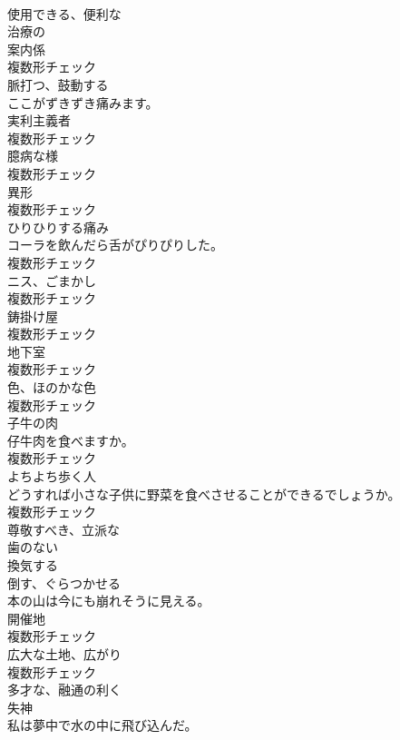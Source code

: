 \documentclass[8pt]{extreport}
\begin{document}
\begin{CJK}{UTF8}{min}
\\	[形容詞]	使用できる、便利な	
\\	[形容詞]	治療の	
\\	[名詞]	案内係	
\\	複数形チェック
\\	[動詞]	脈打つ、鼓動する	
\\	ここがずきずき痛みます。	
\\	[名詞]	実利主義者	
\\	複数形チェック
\\	[名詞]	臆病な様	
\\	複数形チェック
\\	[名詞]	異形	
\\	複数形チェック
\\	[名詞]	ひりひりする痛み	
\\	コーラを飲んだら舌がぴりぴりした。	
\\	複数形チェック
\\	[名詞]	ニス、ごまかし	
\\	複数形チェック
\\	[名詞]	鋳掛け屋	
\\	複数形チェック
\\	[名詞]	地下室	
\\	複数形チェック
\\	[名詞]	色、ほのかな色	
\\	複数形チェック
\\	[名詞]	子牛の肉	
\\	仔牛肉を食べますか。	
\\	複数形チェック
\\	[名詞]	よちよち歩く人	
\\	どうすれば小さな子供に野菜を食べさせることができるでしょうか。	
\\	複数形チェック
\\	[形容詞]	尊敬すべき、立派な	
\\	[形容詞]	⻭のない	
\\	[動詞]	換気する	
\\	[動詞]	倒す、ぐらつかせる	
\\	本の山は今にも崩れそうに見える。	
\\	[名詞]	開催地	
\\	複数形チェック
\\	[名詞]	広大な土地、広がり	
\\	複数形チェック
\\	[形容詞]	多才な、融通の利く	
\\	[名詞]	失神	
\\	私は夢中で水の中に飛び込んだ。	

\end{CJK}
\end{document}

